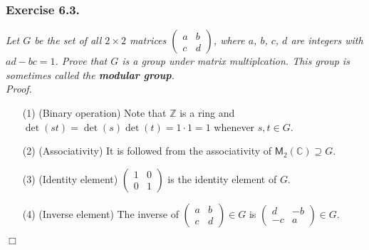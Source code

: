 \documentclass{article}
\begin{document}



\subsubsection*{Exercise 6.3.}
\emph{Let $G$ be the set of all $2 \times 2$ matrices
$\begin{pmatrix}
  a & b \\
  c & d
\end{pmatrix}$, where $a$, $b$, $c$, $d$ are integers with $ad - bc = 1$.
Prove that $G$ is a group under matrix multiplcation.
This group is sometimes called the \textbf{modular group}.} \\



\emph{Proof.}
\begin{enumerate}
\item[(1)]
  (Binary operation)
  Note that $\mathbb{Z}$ is a ring and
  $\det(st) = \det(s)\det(t) = 1 \cdot 1 = 1$ whenever $s, t \in G$.

\item[(2)]
  (Associativity)
  It is followed from the associativity of $\mathsf{M}_2(\mathbb{C}) \supseteq G$.

\item[(3)]
  (Identity element)
  $\begin{pmatrix}
    1 & 0 \\
    0 & 1
  \end{pmatrix}$
  is the identity element of $G$.

\item[(4)]
  (Inverse element)
  The inverse of
  $\begin{pmatrix}
    a & b \\
    c & d
  \end{pmatrix} \in G$
  is
  $\begin{pmatrix}
    d & -b \\
    -c & a
  \end{pmatrix} \in G$.
\end{enumerate}
$\Box$ \\\\



\end{document}
